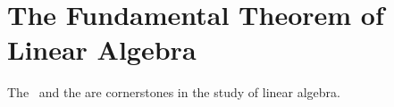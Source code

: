 \chapter[The Fundamental Theorem]{The Fundamental Theorem of Linear Algebra}

The \ftola \ and the \asvd are cornerstones in the study of linear algebra. 




\clearpage

\clearpage


\endinput
